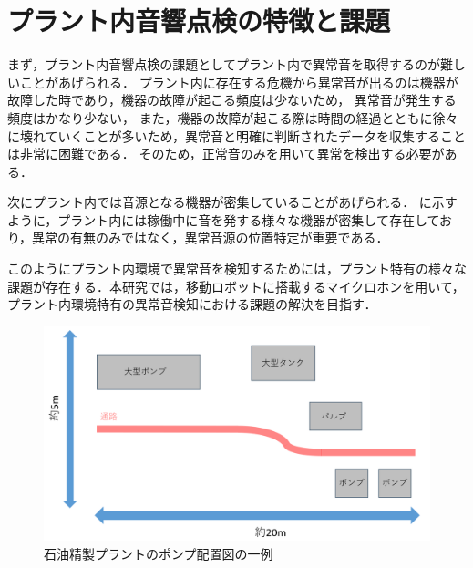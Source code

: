 \documentclass[../main]{subfiles}
\begin{document}
\section{プラント内音響点検の特徴と課題}
\label{sec:intro_anomaly-detection}
まず，プラント内音響点検の課題としてプラント内で異常音を取得するのが難しいことがあげられる．
プラント内に存在する危機から異常音が出るのは機器が故障した時であり，機器の故障が起こる頻度は少ないため，
異常音が発生する頻度はかなり少ない，
また，機器の故障が起こる際は時間の経過とともに徐々に壊れていくことが多いため，異常音と明確に判断されたデータを収集することは非常に困難である．
そのため，正常音のみを用いて異常を検出する必要がある．

次にプラント内では音源となる機器が密集していることがあげられる．
に示すように，プラント内には稼働中に音を発する様々な機器が密集して存在しており，異常の有無のみではなく，異常音源の位置特定が重要である．

このようにプラント内環境で異常音を検知するためには，プラント特有の様々な課題が存在する．本研究では，移動ロボットに搭載するマイクロホンを用いて，
プラント内環境特有の異常音検知における課題の解決を目指す．

\begin{figure}[t]
  \centering
  \includegraphics[keepaspectratio, width=1.0\linewidth]{chap1/pump_location.png}
  \caption{石油精製プラントのポンプ配置図の一例}
  \label{fig:pump_location}
\end{figure}

\subsection{}
\end{document}
